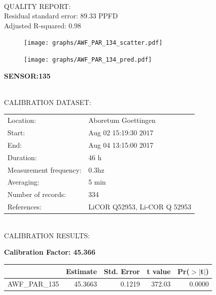\documentclass[oneside]{report}
\begin{document}
\hrulefill\\
QUALITY REPORT:\\
Residual standard error: 89.33 PPFD\\
Adjusted R-squared: 0.98



\begin{figure}[H]
  \centering
  \texttt{[image: graphs/AWF\_PAR\_134\_scatter.pdf]}
\end{figure}




\begin{figure}[H]
  \centering
  \texttt{[image: graphs/AWF\_PAR\_134\_pred.pdf]}
\end{figure}

\pagebreak


\begin{center}
\large{\textbf{SENSOR:135}}\\
\end{center}

\hrulefill\\
CALIBRATION DATASET:\\
\begin{table}[h!]
  \centering
  \label{tab:table1}
  \begin{tabular}{ll}
    Location: & Aboretum Goettingen\\ 
    
    
    Start:  & Aug 02 15:19:30 2017 \\
    End:   & Aug 04 13:15:00 2017\\ 
    Duration: & 46 h\\
    Measurement frequency: & 0.3hz\\
    Averaging:  &5 min\\
    Number of records: & 334 \\
    References: & LiCOR Q52953, Li-COR Q 52953 \\
  \end{tabular}
\end{table}

\hrulefill\\
CALIBRATION RESULTS:\\


\begin{center}
\textbf{\large{Calibration Factor: 45.366}}\\
\end{center}
\begin{table}[ht]
\centering
\begin{tabular}{rrrrr}
  \hline
 & Estimate & Std. Error & t value & Pr($>$$|$t$|$) \\ 
  \hline
AWF\_PAR\_135 & 45.3663 & 0.1219 & 372.03 & 0.0000 \\ 
   \hline
\end{tabular}
\end{table}
\end{document}
